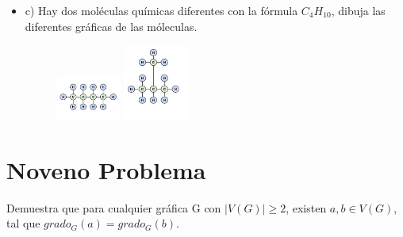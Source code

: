 \documentclass[journal,12pt,onecolumn]{IEEEtran}                %
\theoremstyle{break}                                            %
\begin{document}
\begin{itemize}
            \item 
                c) Hay dos moléculas químicas diferentes con la fórmula $C_4H_{10}$, dibuja las diferentes 
                gráficas de las móleculas.

                \begin{figure}[h]
                    \includegraphics[width=0.2\textwidth]{84}
                    \includegraphics[width=0.2\textwidth]{85}
                \end{figure}
        \end{itemize}

    \clearpage

    \section*{Noveno Problema}
        Demuestra que para cualquier gráfica G con 
        $|V(G)| \geq 2$, existen $a, b \in V (G)$, tal que $grado_G(a) = grado_G(b)$.
\end{document}
